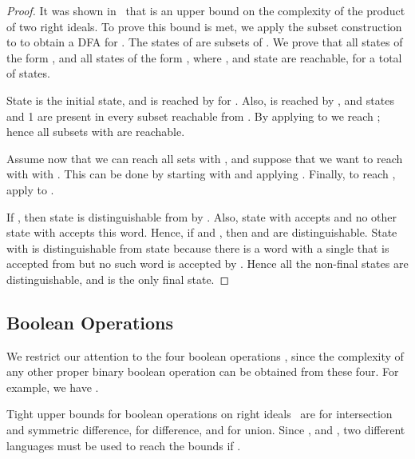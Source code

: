 \documentclass[final]{dmtcs-episciences}
\theoremstyle{definition}
\theoremstyle{remark}
\begin{document}
\begin{proof}
It was shown in~\cite{BJL13} that  is an upper bound on the complexity of the product of two right ideals. To prove this bound is met, 
we apply the subset construction to  to obtain a DFA  for .
The states of  are subsets of .
We prove that all states of the form ,  and all states of the form
, where , and state 
 are reachable, for a total of  states.


State  is the initial state, and   is reached by  for .
Also,  is reached by , and  
states  and 1 are present in every subset reachable from . 
By applying  to  we reach ; hence all subsets 
 with  are reachable.

Assume now that we can reach all sets  with , and 
suppose that we want to reach  with 
with .
 This can be done by starting with  and applying . 
Finally, to reach , apply  to .

If , then state  is distinguishable from  by 
.
Also, state  with  accepts  and no other state  with  accepts this word. 
Hence, if  and , then 
 and  are distinguishable.
State  with  is distinguishable from state 
because there is a word with a single  that is accepted from 
but no such word is accepted by . Hence all the non-final states are distinguishable, and  is the only final state.
\end{proof}


\subsection{Boolean Operations}
\label{ssec:boolean_right}

We restrict our attention to the four boolean operations , since the complexity of any other proper binary boolean operation can be obtained from these four. For example,
we have .

Tight upper bounds for boolean operations on right ideals~\cite{BJL13}  are  for intersection and symmetric difference,  for difference, and  for union.
Since , and 
, two different languages must be used
to reach the bounds if . 
\end{document}
